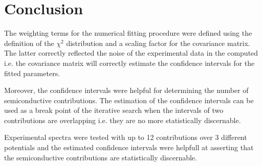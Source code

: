 \section{Conclusion} 

The weighting terms for the numerical fitting procedure were defined using 
the definition of the $\chi ^2$ distribution and a scaling factor for the covariance matrix.
The latter correctly reflected the noise of the experimental data in the computed 
i.e. the covariance matrix will correctly estimate the confidence intervals 
for the fitted parameters. 

Moreover, the confidence intervals were helpful for determining the number of 
semiconductive contributions. The estimation of the confidence intervals can 
be used as a break point of the iterative search when the intervals of two 
contributions are overlapping i.e. they are no more statistically discernable. 

Experimental spectra were tested with up to 12 contributions over 3 different 
potentials and the estimated confidence intervals were helpfull at asserting 
that the semiconductive contributions are statistically discernable.
